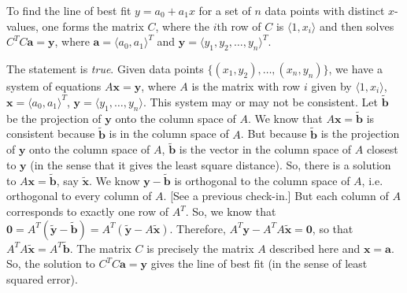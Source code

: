 \documentclass[11pt,letterpaper]{article}
\begin{document}
 To find the line of best fit $y= a_0 + a_1 x$ for a set of $n$ data points with distinct $x$-values, one forms the matrix $C$, where the $i$th row of $C$ is $\langle 1, x_i \rangle$ and then solves $C^TC \mathbf{a}= \mathbf{y}$, where $\mathbf{a}= \langle a_0, a_1 \rangle^T$ and $\mathbf{y}= \langle y_1, y_2, \ldots, y_n \rangle^T$. \pspace

\sol The statement is \textit{true}. Given data points $\{ (x_1, y_2), \ldots, (x_n, y_n) \}$, we have a system of equations $A\mathbf{x}= \mathbf{y}$, where $A$ is the matrix with row $i$ given by $\langle 1, x_i \rangle$, $\mathbf{x}= \langle a_0, a_1 \rangle^T$, $\mathbf{y}= \langle y_1, \ldots, y_n \rangle$. This system may or may not be consistent. Let $\widetilde{\mathbf{b}}$ be the projection of $\mathbf{y}$ onto the column space of $A$. We know that $A \mathbf{x}= \widetilde{\mathbf{b}}$ is consistent because $\widetilde{\mathbf{b}}$ is in the column space of $A$. But because $\widetilde{\mathbf{b}}$ is the projection of $\mathbf{y}$ onto the column space of $A$, $\widetilde{\mathbf{b}}$ is the vector in the column space of $A$ closest to $\mathbf{y}$ (in the sense that it gives the least square distance). So, there is a solution to $A\mathbf{x}= \widetilde{\mathbf{b}}$, say $\widetilde{\mathbf{x}}$. We know $\mathbf{y} - \widetilde{\mathbf{b}}$ is orthogonal to the column space of $A$, i.e. orthogonal to every column of $A$. [See a previous check-in.] But each column of $A$ corresponds to exactly one row of $A^T$. So, we know that $\mathbf{0}= A^T(\widetilde{\mathbf{y}} - \widetilde{\mathbf{b}})= A^T (\widetilde{\mathbf{y}} - A \widetilde{\mathbf{x}})$. Therefore, $A^T \mathbf{y} - A^TA \widetilde{\mathbf{x}}= \mathbf{0}$, so that $A^TA \widetilde{\mathbf{x}}= A^T \widetilde{\mathbf{b}}$. The matrix $C$ is precisely the matrix $A$ described here and $\mathbf{x}= \mathbf{a}$. So, the solution to $C^TC \mathbf{a}= \mathbf{y}$ gives the line of best fit (in the sense of least squared error). 
\end{document}
